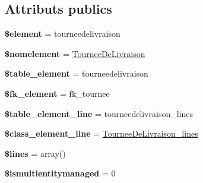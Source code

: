 \subsection*{Attributs publics}
\begin{DoxyCompactItemize}
\item 
\mbox{\label{classTourneeDeLivraison_aa7aaab675e9fde735b127bb82c81a1c8}} 
{\bfseries \$element} = \textquotesingle{}tourneedelivraison\textquotesingle{}
\item 
\mbox{\label{classTourneeDeLivraison_a5300e77f912cfb9b38fb2235dda11fcc}} 
{\bfseries \$nomelement} = \textquotesingle{}\hyperlink{classTourneeDeLivraison}{Tournee\+De\+Livraison}\textquotesingle{}
\item 
\mbox{\label{classTourneeDeLivraison_a5d0c6bf2bb3cc1bb8439d61c6e2fbbdf}} 
{\bfseries \$table\+\_\+element} = \textquotesingle{}tourneedelivraison\textquotesingle{}
\item 
\mbox{\label{classTourneeDeLivraison_a18156e08e07e55f04eafe15500593efa}} 
{\bfseries \$fk\+\_\+element} = \textquotesingle{}fk\+\_\+tournee\textquotesingle{}
\item 
\mbox{\label{classTourneeDeLivraison_a6174c5b2f332985921b34a4243f83e33}} 
{\bfseries \$table\+\_\+element\+\_\+line} = \textquotesingle{}tourneedelivraison\+\_\+lines\textquotesingle{}
\item 
\mbox{\label{classTourneeDeLivraison_a1bd8c65335e6b62ac226889b4e4d65f8}} 
{\bfseries \$class\+\_\+element\+\_\+line} = \textquotesingle{}\hyperlink{classTourneeDeLivraison__lines}{Tournee\+De\+Livraison\+\_\+lines}\textquotesingle{}
\item 
\mbox{\label{classTourneeDeLivraison_aa75472586287d81986cbfb4fbb084300}} 
{\bfseries \$lines} = array()
\item 
\mbox{\label{classTourneeDeLivraison_a310b350e3e89fd6d66fd3e74720a1567}} 
{\bfseries \$ismultientitymanaged} = 0
\item 
\mbox{\label{classTourneeDeLivraison_ab2065ed4b2fff4a39d62f50aa282355d}} 

\end{DoxyCompactItemize}
